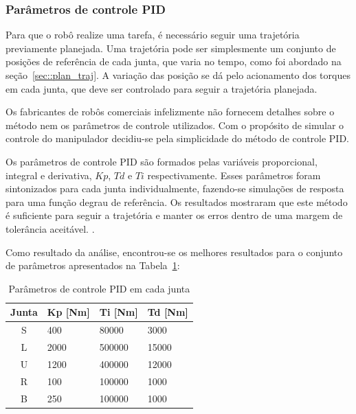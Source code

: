 \subsubsection{Parâmetros de controle PID}

Para que o robô realize uma tarefa, é necessário seguir uma trajetória
previamente planejada. Uma trajetória pode ser simplesmente um conjunto de
posições de referência de cada junta, que varia no tempo, como foi abordado na
seção~\ref{sec::plan_traj}. A variação das posição se dá pelo acionamento dos
torques em cada junta, que deve ser controlado para seguir a trajetória
planejada. 

Os fabricantes de robôs comerciais infelizmente não fornecem detalhes sobre o
método nem os parâmetros de controle utilizados.
Com o propósito de simular o controle do manipulador decidiu-se pela
simplicidade do método de controle PID.

Os parâmetros de controle PID são formados pelas variáveis proporcional,
integral e derivativa, $Kp$, $Td$ e $Ti$ respectivamente. Esses parâmetros
foram sintonizados para cada junta individualmente, fazendo-se simulações de
resposta para uma função degrau de referência. Os resultados mostraram que este
método é suficiente para seguir a trajetória e manter os erros dentro de uma
margem de tolerância aceitável. 
.

Como resultado da análise, encontrou-se os melhores resultados
para o conjunto de parâmetros apresentados na
Tabela~\ref{tab::pid}:
%
\begin{table}[h]
\centering
\caption{Parâmetros de controle PID em cada junta}
\label{tab::pid}
\begin{tabular}{@{}clll@{}}
\toprule
\textbf{Junta} & \textbf{Kp [Nm]} & \textbf{Ti [Nm]} & \textbf{Td [Nm]} \\ \midrule 
S              & 400         & 80000       & 3000        \\
L              & 2000        & 500000      & 15000       \\
U              & 1200        & 400000      & 12000       \\
R              & 100         & 100000      & 1000        \\
B              & 250         & 100000      & 1000        \\ \bottomrule
\end{tabular}
\end{table}
%

